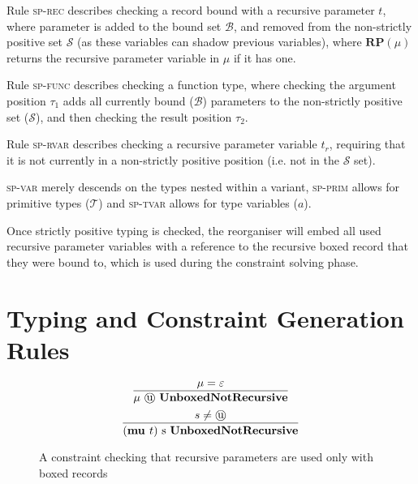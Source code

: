 Rule \textsc{sp-rec} describes checking a record bound with a recursive parameter $t$, where parameter 
is added to the bound set $\mathcal{B}$, and removed from the non-strictly positive set $\mathcal{S}$
(as these variables can shadow previous variables), where $\textbf{RP}(\mu)$ returns the recursive
parameter variable in $\mu$ if it has one.

Rule \textsc{sp-func} describes checking a function type, where checking the argument position $\tau_1$ adds
all currently bound ($\mathcal{B}$) parameters to the non-strictly positive set ($\mathcal{S}$), and then
checking the result position $\tau_2$.

Rule \textsc{sp-rvar} describes checking a recursive parameter variable $t_r$, requiring that it is not currently
in a non-strictly positive position (i.e. not in the $\mathcal{S}$ set). 

\textsc{sp-var} merely descends on the types nested within a variant,
\textsc{sp-prim} allows for primitive types ($\mathcal{T}$) and
\textsc{sp-tvar} allows for type variables ($a$).

Once strictly positive typing is checked, the reorganiser will embed all used recursive parameter variables
with a reference to the recursive boxed record that they were bound to, which is used during the constraint
solving phase.

\section{Typing and Constraint Generation Rules}

\begin{figure}
    \centering
    $$
        \infer{
            \mu \text{ \textcircled{u} } \textbf{UnboxedNotRecursive}
        }{
            \mu = \varepsilon
        }
    $$
    $$
        \infer{
            (\textbf{mu } t) \text{ s } \textbf{UnboxedNotRecursive}
        }{
            s \neq \text{\textcircled{u}}
        }
    $$
    \caption{A constraint checking that recursive parameters are used only with boxed records}
    \label{fig:unboxednotrecursive}
\end{figure}

